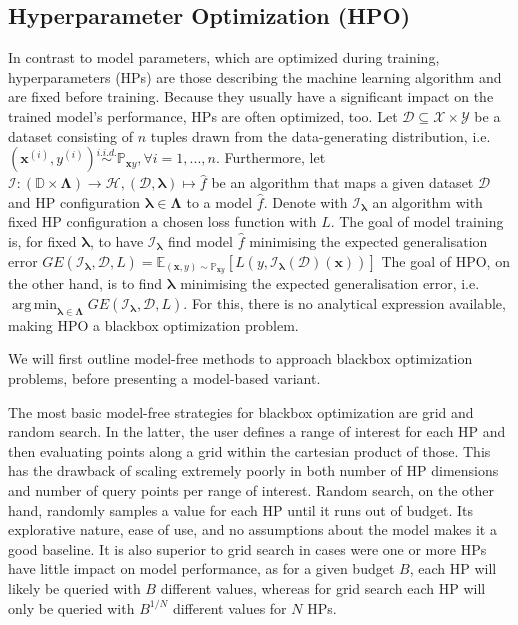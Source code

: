 \documentclass[twoside,11pt]{article}
\DeclareMathOperator*{\argmin}{arg\,min}
\begin{document}
\subsection{Hyperparameter Optimization (HPO)}
In contrast to model parameters, which are optimized during training, hyperparameters (HPs) are those describing the machine learning algorithm and are
fixed before training. Because they usually have a significant impact on the trained model's performance, HPs are often optimized, too.
Let $\mathcal{D}\subseteq\mathcal{X}\times\mathcal{Y}$ be a dataset consisting of $n$
tuples drawn from the data-generating distribution, i.e. $(\boldsymbol{x}^{(i)}, y^{(i)})\stackrel{i.i.d.}{\sim}\mathbb{P}_{\boldsymbol{x}y},\forall i=1,...,n$.
Furthermore, let $\mathcal{I}:(\mathbb{D}\times\boldsymbol\Lambda)\rightarrow\mathcal{H}, (\mathcal{D},\boldsymbol\lambda)\mapsto\hat{f}$
be an algorithm that maps a given dataset $\mathcal{D}$ and HP configuration $\boldsymbol\lambda\in\boldsymbol\Lambda$ to a model $\hat{f}$.
Denote with $\mathcal{I}_{\boldsymbol\lambda}$ an algorithm with fixed HP configuration a chosen loss function with $L$.
The goal of model training is, for fixed $\boldsymbol\lambda$, to have $\mathcal{I}_{\boldsymbol\lambda}$ find model $\hat{f}$ minimising the expected generalisation error
$GE(\mathcal{I}_{\boldsymbol\lambda},\mathcal{D},L)=\mathbb{E}_{(\boldsymbol{x},y)\sim\mathbb{P}_{\boldsymbol{x}y}}[L(y,\mathcal{I}_{\boldsymbol\lambda}(\mathcal{D})(\boldsymbol{x}))]$
The goal of HPO, on the other hand, is to find $\boldsymbol\lambda$ minimising the expected generalisation error,
i.e. $\argmin_{\boldsymbol\lambda\in\boldsymbol\Lambda} GE(\mathcal{I}_{\boldsymbol\lambda},\mathcal{D},L)$.
For this, there is no analytical expression available, making HPO a blackbox optimization problem. \citep[pp. 2f]{10.1145/3610536}

We will first outline model-free methods to approach blackbox optimization problems, before presenting a model-based variant.

The most basic model-free strategies for blackbox optimization are grid and random search.
In the latter, the user defines a range of interest for each HP and then evaluating points along a grid within the cartesian product of those.
This has the drawback of scaling extremely poorly in both number of HP dimensions and number of query points per range of interest.
Random search, on the other hand, randomly samples a value for each HP until it runs out of budget. Its explorative nature, ease of use, and no assumptions
about the model makes it a good baseline. It is also superior to grid search in cases were one or more HPs have little impact on model performance,
as for a given budget $B$, each HP will likely be queried with $B$ different values, whereas for grid search each HP will only be queried with $B^{1/N}$
different values for $N$ HPs. \citep[chap. 1.3]{feurer_hyperparameter_2019}
\end{document}
